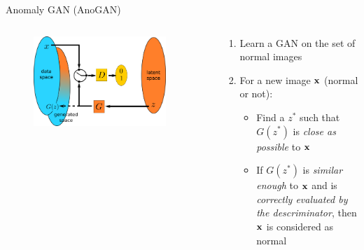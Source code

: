 \documentclass[xcolor=pdftex,dvipsnames,table,mathserif,aspectratio=169]{beamer}
\begin{document}




\begin{frame}{Anomaly GAN (AnoGAN)~\tiny{\cite{schlegl_unsupervised_2017}}}

\begin{columns}
  \begin{column}{.5\textwidth}
    \begin{figure}[ht]
    \centering
    \includegraphics[width=0.9\textwidth]{gan2}
  \end{figure}

  \end{column}

  \begin{column}{.5\textwidth}
  \begin{enumerate}
  \item Learn a GAN on the set of normal images
  \item For a new image $\mathbf{x}$ (normal or not):
    \begin{itemize}
    \item Find a $z^*$ such that $G(z^*)$ is \emph{close as possible} to $\mathbf{x}$
    \item If $G(z^*)$ is \emph{similar enough} to $\mathbf{x}$ and is \emph{correctly evaluated by the descriminator}, then $\mathbf{x}$ is considered as normal
    \end{itemize}
  \end{enumerate}

  \end{column}
\end{columns}

\end{frame}
\end{document}
